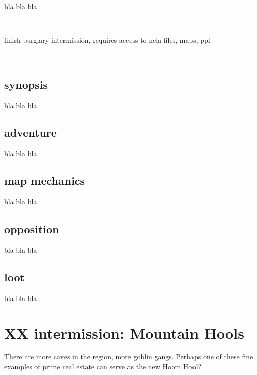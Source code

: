 bla bla bla

\

\todo finish burglary intermission, requires access to nela files, maps, ppl

\


\subsection*{synopsis}

bla bla bla


\subsection*{adventure}

bla bla bla


\subsection*{map mechanics}

bla bla bla


\subsection*{opposition}

bla bla bla


\subsection*{loot}

bla bla bla










\clearpage
\section*{XX intermission: Mountain Hools}

There are more caves in the region, more goblin gangs. Perhaps one of these fine examples of prime real estate can serve as the new Hoom Hool?


